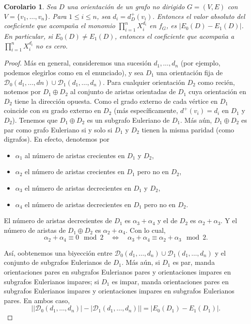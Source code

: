 \documentclass[12pt]{report}
\theoremstyle{plain}
\newtheorem{corollary}[theorem]{Corolario}
\theoremstyle{definition}
\newcommand{\abs}[1]{\left \vert #1 \right \vert}
\begin{document}
\begin{corollary}\label{corolario:coloreos y orientaciones de grafos - corolario 1 del teorema principal}
Sea $D$ una orientación de un grafo no dirigido $G = (V,E)$ con $V = \{v_1, \ldots, v_n\}$. Para $1 \leq i \leq n$, sea $d_i = d^+_D (v_i)$. Entonces el valor absoluto del coeficiente que acompaña el monomio $\prod_{i = 1}^n X_i^{d_i}$ en $f_G$, es $\abs{E_0 (D) - E_1 (D)}$. En particular, si $E_0 (D )\neq E_1 (D)$, entonces el coeficiente que acompaña a $\prod_{i = 1}^n X_i^{d_i}$ no es cero.
\end{corollary}
\begin{proof}
Más en general, consideremos una sucesión $d_1, \ldots, d_n$ (por ejemplo, podemos elegirlos como en el enunciado), y sea $D_1$ una orientación fija de $\mathcal D _0 (d_1, \ldots, dn) \cup \mathcal D _1 (d_1, \ldots, d_n)$. Para cualquier orientación $D_2$ como recién, notemos por $D_1 \oplus D_2$ al conjunto de aristas orientadas de $D_1$ cuya orientación en $D_2$ tiene la dirección opuesta. Como el grado externo de cada vértice en $D_1$ coincide con su grado externo en $D_2$ (más específicamente, $d^+ (v_i) = d_i$ en $D_1$ y $D_2$). Tenemos que $D_1 \oplus D_2$ es un subgrafo Euleriano de $D_1$. Más aún, $D_1 \oplus D_2$ es par como grafo Euleriano si y solo si $D_1$ y $D_2$ tienen la misma paridad (como digrafos). En efecto, denotemos por
\begin{itemize}
\item $\alpha_1$ al número de aristas crecientes en $D_1$ y $D_2$,

\item $\alpha_2$ el número de aristas crecientes en $D_1$ pero no en $D_2$,

\item $\alpha_3$ el número de aristas decrecientes en $D_1$ y $D_2$,

\item $\alpha_4$ el número de aristas decrecientes en $D_1$ pero no en $D_2$.
\end{itemize}
El número de aristas decrecientes de $D_1$ es $\alpha_3 + \alpha_4$ y el de $D_2$ es $\alpha_2 + \alpha_3$. Y el número de aristas de $D_1 \oplus D_2$ es $\alpha_2 + \alpha_4$. Con lo cual,
\[
    \alpha_2 + \alpha_4 \equiv 0 \mod 2 \quad \Leftrightarrow \quad \alpha_3 + \alpha_4 \equiv \alpha_2 + \alpha_3 \mod 2.
\]

Así, oobtenemos una biyección entre $\mathcal D _0 (d_1, \ldots, d_n) \cup \mathcal D_1 (d_1, \ldots, d_n)$ y el conjunto de subgrafos Eulerianos de $D_1$. Más aún, si $D_1$ es par, manda orientaciones pares en subgrafos Eulerianos pares y orientaciones impares en subgrafos Eulerianos impares; si $D_1$ es impar, manda orientaciones pares en subgrafos Eulerianos impares y orientaciones impares en subgrafos Eulerianos pares. En ambos caso,
\[
    \abs{\abs{\mathcal D _0 (d_1, \ldots, d_n)} - \abs{\mathcal D _1 (d_1, \ldots, d_n)}} = \abs{E_0 (D_1) - E_1 (D_1)}.
\]

\end{proof}
\end{document}

